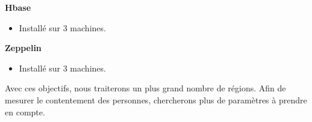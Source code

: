 \documentclass[a4paper,oneside,10pt]{article}
\begin{document}
\textbf{Hbase}
\begin{itemize}
	\item Installé sur 3 machines. 
\end{itemize}
	
\textbf{Zeppelin}
\begin{itemize}
	\item Installé sur 3 machines. 
\end{itemize}


Avec ces objectifs, nous traiterons un plus grand nombre de régions. 
Afin de mesurer le contentement des personnes, chercherons plus de paramètres à prendre en compte. 
\end{document}
